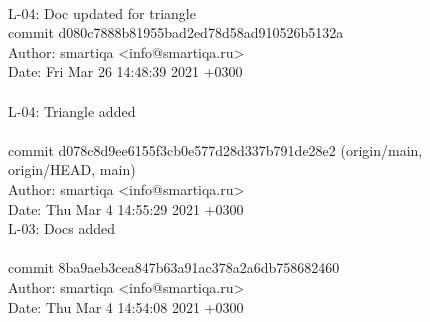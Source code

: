 \documentclass{article}
\begin{document}
\\
    L-04: Doc updated for triangle
\\
commit d080c7888b81955bad2ed78d58ad910526b5132a\\
Author: smartiqa <info@smartiqa.ru>\\
Date:   Fri Mar 26 14:48:39 2021 +0300\\
\\
    L-04: Triangle added\\
\\
commit d078c8d9ee6155f3cb0e577d28d337b791de28e2 (origin/main, origin/HEAD, main)\\
Author: smartiqa <info@smartiqa.ru>\\
Date:   Thu Mar 4 14:55:29 2021 +0300\\

    L-03: Docs added\\
\\
commit 8ba9aeb3cea847b63a91ac378a2a6db758682460\\
Author: smartiqa <info@smartiqa.ru>\\
Date:   Thu Mar 4 14:54:08 2021 +0300\\
\\
\end{document}
